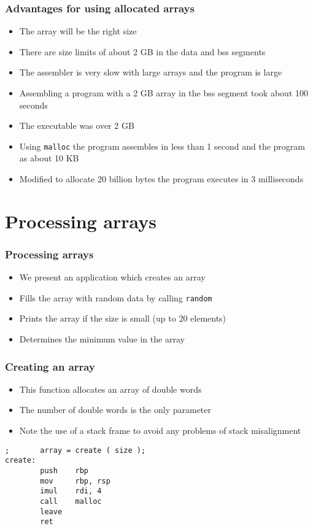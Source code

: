\documentclass{beamer}
\begin{document}
\begin{frame}
    \frametitle{Advantages for using allocated arrays}
    \begin{itemize}
        \item The array will be the right size
        \item There are size limits of about 2 GB in the data and bss segments
        \item The assembler is very slow with large arrays and the program is large
        \item Assembling a program with a 2 GB array in the bss segment
              took about 100 seconds
        \item The executable was over 2 GB
        \item Using {\tt malloc} the program assembles in less than 1 second
              and the program as about 10 KB
        \item Modified to allocate 20 billion bytes the program executes in 3 milliseconds
    \end{itemize}
\end{frame}

\section{Processing arrays}

\begin{frame}
    \frametitle{Processing arrays}
    \begin{itemize}
        \item We present an application which creates an array
        \item Fills the array with random data by calling {\tt random}
        \item Prints the array if the size is small (up to 20 elements)
        \item Determines the minimum value in the array
    \end{itemize}
\end{frame}

\begin{frame}[fragile]
    \frametitle{Creating an array}
    \begin{itemize}
        \item This function allocates an array of double words
        \item The number of double words is the only parameter
        \item Note the use of a stack frame to avoid any problems
              of stack misalignment
    \end{itemize}
\begin{verbatim}
;       array = create ( size );
create:
        push    rbp
        mov     rbp, rsp
        imul    rdi, 4
        call    malloc
        leave
        ret
\end{verbatim}
\end{frame}
\end{document}
